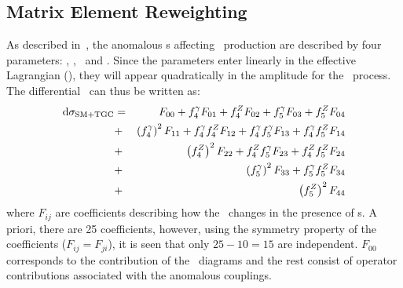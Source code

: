 \subsection{Matrix Element Reweighting}
\label{sec:TGC-reweighting}

As described in~, the anomalous \TGC s affecting \ZZ\
production are described by four parameters: \ffourg, \ffourZ, \ffiveg\ and
\ffiveZ.
Since the parameters enter linearly in the effective Lagrangian
(), they will appear
quadratically in the amplitude for the \ZZllll\ process. The differential \cx\
can thus be written as:
\begin{eqnarray}\label{eqn:dsigma}
{\rm d}\sigma_{\rm SM+TGC} & = & F_{00} + f_4^\gamma F_{01} + f_4^Z F_{02} + f_5^\gamma F_{03} + f_5^Z F_{04}  \nonumber \\
&+& \left(f_4^\gamma\right)^2F_{11} + f_4^\gamma f_4^Z F_{12} +  f_4^\gamma f_5^\gamma F_{13} + f_4^\gamma f_5^Z F_{14}  \nonumber \\
&+& \left(f_4^Z\right)^2F_{22} + f_4^Zf_5^\gamma F_{23} + f_4^Zf_5^Z F_{24}  \nonumber \\
&+& \left(f_5^\gamma\right)^2F_{33} + f_5^\gamma f_5^Z F_{34} \nonumber \\
&+& \left(f_5^Z\right)^2F_{44}
\end{eqnarray}
where $F_{ij}$ are coefficients describing how the \cx\ changes in the presence
of \TGC s. A priori, there are 25 coefficients, however, using the 
symmetry property of the coefficients ($F_{ij}=F_{ji}$), it is seen 
that only $25-10=15$ are independent. $F_{00}$ corresponds to the contribution
of the \sm\ diagrams and the rest consist of operator contributions associated with the
anomalous couplings. 

